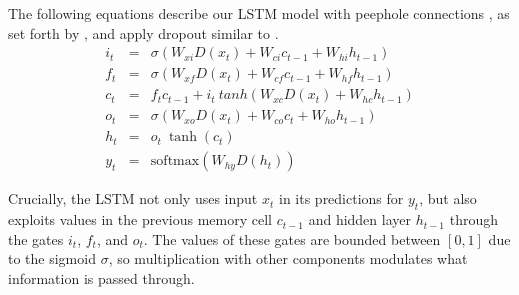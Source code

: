 The following equations describe our LSTM model with peephole connections \cite{Get02}, as set forth by , and apply dropout similar to .
\vspace{-.6em}
\begin{eqnarray*}
  i_{t}\!\!\! &=& \!\!\! \sigma (W_{xi} D(x_{t}) + W_{ci} c_{t-1} + W_{hi} h_{t-1}) \\[-.25em]
  f_{t}\!\!\! &=& \!\!\! \sigma (W_{xf} D(x_{t}) + W_{cf} c_{t-1} + W_{hf} h_{t-1}) \\[-.25em]
  c_{t}\!\!\! &=& \!\!\! f_{t} c_{t-1}\! + \!i_{t} \ tanh (W_{xc} D(x_{t})\! + \!W_{hc} h_{t-1}\!) \\[-.25em]
  o_{t}\!\!\! &=& \!\!\! \sigma (W_{xo} D(x_{t}) + W_{co} c_{t} + W_{ho} h_{t-1}) \\[-.25em]
  h_{t}\!\!\! &=& \!\!\! o_{t} \ \tanh(c_{t}) \\[-.25em]
  y_{t}\!\!\! &=& \!\!\! \mathrm{softmax}(W_{hy} D(h_{t}))
\end{eqnarray*}

\vspace{-.6em}
Crucially, the LSTM not only uses input $x_t$ in its predictions for $y_t$, but also exploits values in the previous memory cell $c_{t-1}$ and hidden layer $h_{t-1}$ through the gates $i_t$, $f_t$, and $o_t$. The values of these gates are bounded between $[0,1]$ due to the sigmoid  $\sigma$, so multiplication with other components modulates what information is passed through. 

